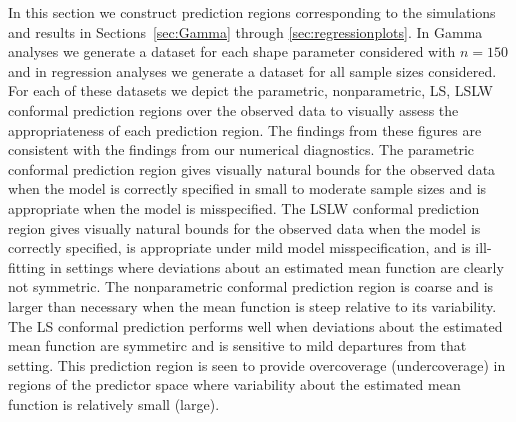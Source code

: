 \documentclass[11pt]{article}\usepackage[]{graphicx}\usepackage[]{color}
\begin{document}
In this section we construct prediction regions corresponding to the 
simulations and results in Sections~\ref{sec:Gamma} through 
\ref{sec:regressionplots}.  In Gamma analyses we generate a dataset for each 
shape parameter considered with $n = 150$ and in regression analyses we 
generate a dataset for all sample sizes considered.  For each of these datasets 
we depict the parametric, nonparametric, LS, LSLW conformal prediction regions 
over the observed data to visually assess the appropriateness of each 
prediction region.  The findings from these figures are consistent with the 
findings from our numerical diagnostics.  
The parametric conformal prediction region gives visually natural bounds for 
the observed data when the model is correctly specified in small to moderate 
sample sizes and is appropriate when the model is misspecified. 
The LSLW conformal prediction region gives visually natural bounds for the 
observed data when the model is correctly specified, is appropriate under mild 
model misspecification, and is ill-fitting in settings where deviations about 
an estimated mean function are clearly not symmetric.
The nonparametric conformal prediction region is coarse and is larger than 
necessary when the mean function is steep relative to its variability.  
The LS conformal prediction performs well when deviations about the estimated 
mean function are symmetirc and is sensitive to mild departures from that 
setting.  This prediction region is seen to provide overcoverage 
(undercoverage) in regions of the predictor space where variability about the 
estimated mean function is relatively small (large).
\end{document}
